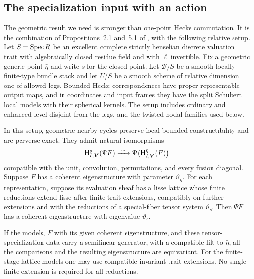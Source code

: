 \subsection{The specialization input with an action}

The geometric result we need is stronger than one-point Hecke commutation.
It is the combination of Propositions~2.1 and~5.1 of \cite{CT}, with
the following relative setup. Let $S=\operatorname{Spec} R$ be an excellent complete
strictly henselian discrete valuation trait with algebraically closed
residue field and with $\ell$ invertible. Fix a geometric generic point
$\bar\eta$ and write $s$ for the closed point. Let $\mathcal B/S$ be a
smooth locally finite-type bundle stack and let $U/S$ be a smooth scheme
of relative dimension one of allowed legs. Bounded Hecke correspondences
have proper representable output maps, and in coordinates and input frames
they have the split Schubert local models with their spherical kernels.
The setup includes ordinary and enhanced level disjoint from the legs,
and the twisted nodal families used below.

\begin{proposition}
\label{prop:equivariant-specialization}
In this setup, geometric nearby cycles preserve local bounded
constructibility and are perverse exact. They admit natural isomorphisms
\begin{equation}\label{eq:hecke-specialization}
 \mathsf H^s_{I,\boldsymbol V}(\Psi F)
  \xrightarrow{\ \sim\ }
  \Psi\bigl(\mathsf H^{\bar\eta}_{I,\boldsymbol V}(F)\bigr)
\end{equation}
compatible with the unit, convolution, permutations, and every fusion
diagonal. Suppose $F$ has a coherent eigenstructure with parameter
$\vartheta_{\bar\eta}$. For each representation, suppose its evaluation
sheaf has a lisse lattice whose finite reductions extend lisse after
finite trait extensions, compatibly on further extensions and with the
reductions of a special-fiber tensor system $\vartheta_s$. Then $\Psi F$
has a coherent eigenstructure with eigenvalue $\vartheta_s$.

If the models, $F$ with its given coherent eigenstructure, and these
tensor-specialization data carry a semilinear generator, with a
compatible lift to $\bar\eta$, all the
comparisons and the resulting eigenstructure are equivariant. For the
finite-stage lattice models one may use compatible invariant trait
extensions. No single finite extension is required for all reductions.
\end{proposition}

